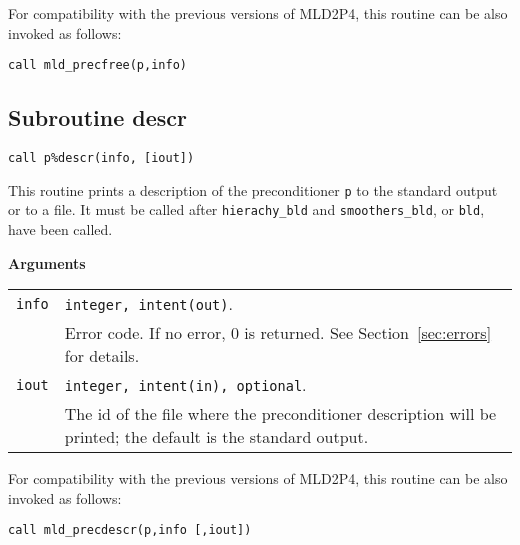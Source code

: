 \baselineskip
For compatibility with the previous versions of MLD2P4, this routine can be also invoked
as follows:

\begin{center}
\verb|call mld_precfree(p,info)|
\end{center}


\clearpage

\subsection{Subroutine descr\label{sec:precdescr}}

\begin{center}
\verb|call p%descr(info, [iout])|\\
\end{center}

\noindent
This routine prints a description of the preconditioner \verb|p| to the standard output or
to a file. It must be called after \verb|hierachy_bld| and \verb|smoothers_bld|,
or \verb|bld|, have been called.

{\baselineskip\noindent\large\bfseries Arguments} \smallskip

\begin{tabular}{p{1.2cm}p{12cm}}
\verb|info|   & \verb|integer, intent(out)|.\\
              & Error code. If no error, 0 is returned. See Section~\ref{sec:errors} for details.\\
\verb|iout|   & \verb|integer, intent(in), optional|.\\
              & The id of the file where the preconditioner description
                will be printed; the default is the standard output.\\
\end{tabular}

\baselineskip
For compatibility with the previous versions of MLD2P4, this routine can be also invoked
as follows:

\begin{center}
\verb|call mld_precdescr(p,info [,iout])|
\end{center}


